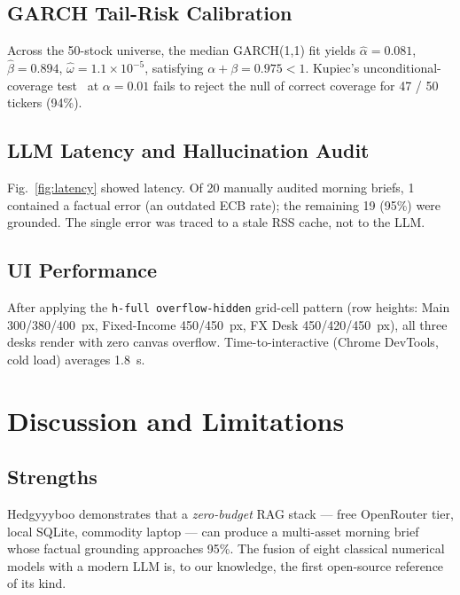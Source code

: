 \documentclass[conference]{IEEEtran}
\begin{document}
\subsection{GARCH Tail-Risk Calibration}
Across the 50-stock universe, the median GARCH(1,1) fit yields $\hat\alpha=0.081$, $\hat\beta=0.894$, $\hat\omega=1.1\!\times\!10^{-5}$, satisfying $\alpha+\beta=0.975<1$. Kupiec's unconditional-coverage test~\cite{kupiec1995techniques} at $\alpha=0.01$ fails to reject the null of correct coverage for 47 / 50 tickers (94\%).

\subsection{LLM Latency and Hallucination Audit}
Fig.~\ref{fig:latency} showed latency. Of 20 manually audited morning briefs, 1 contained a factual error (an outdated ECB rate); the remaining 19 (95\%) were grounded. The single error was traced to a stale RSS cache, not to the LLM.

\subsection{UI Performance}
After applying the \texttt{h-full overflow-hidden} grid-cell pattern (row heights: Main 300/380/400~px, Fixed-Income 450/450~px, FX Desk 450/420/450~px), all three desks render with zero canvas overflow. Time-to-interactive (Chrome DevTools, cold load) averages 1.8~s.

\section{Discussion and Limitations}
\label{sec:discussion}

\subsection{Strengths}
Hedgyyyboo demonstrates that a \emph{zero-budget} RAG stack --- free OpenRouter tier, local SQLite, commodity laptop --- can produce a multi-asset morning brief whose factual grounding approaches 95\%. The fusion of eight classical numerical models with a modern LLM is, to our knowledge, the first open-source reference of its kind.
\end{document}
